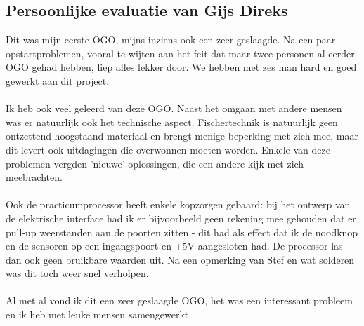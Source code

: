 \subsection{Persoonlijke evaluatie van Gijs Direks}

Dit was mijn eerste OGO, mijns inziens ook een zeer geslaagde.
Na een paar opstartproblemen, vooral te wijten aan het feit dat
maar twee personen al eerder OGO gehad hebben, liep alles lekker
 door. We hebben met zes man hard en goed gewerkt aan dit project.\\
\\
Ik heb ook veel geleerd van deze OGO. Naast het omgaan met andere
mensen was er natuurlijk ook het technische aspect. Fischertechnik
is natuurlijk geen ontzettend hoogstaand materiaal en brengt menige
beperking met zich mee, maar dit levert ook uitdagingen die
overwonnen moeten worden. Enkele van deze problemen vergden 'nieuwe'
oplossingen, die een andere kijk met zich meebrachten.\\
\\
Ook de practicumprocessor heeft enkele kopzorgen gebaard: bij het
ontwerp van de elektrische interface had ik er bijvoorbeeld geen
rekening mee gehouden dat er pull-up weerstanden aan de poorten
zitten - dit had als effect dat ik de noodknop en de sensoren op een
ingangspoort en +5V aangesloten had. De processor las dan ook geen
bruikbare waarden uit.
Na een opmerking van Stef en wat solderen was dit toch weer snel verholpen.\\
\\
Al met al vond ik dit een zeer geslaagde OGO, het was een interessant probleem en ik heb met leuke mensen samengewerkt.
